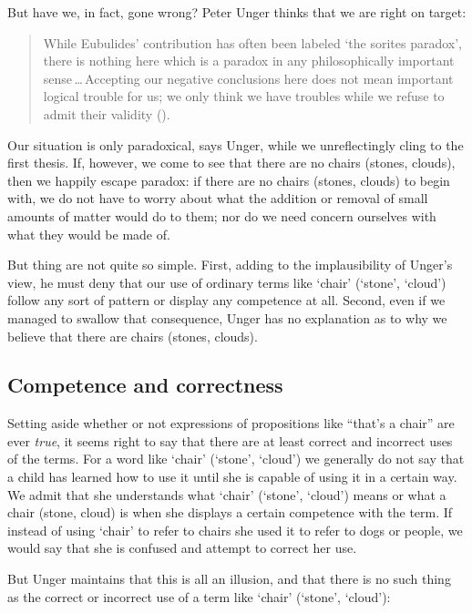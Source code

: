 \documentclass[11pt]{standalone} \newif\ifstandlone \standalonetrue
\newenvironment{squote}{%
	\begin{quote}\begin{singlespace}%
	}{%
	\end{singlespace}\end{quote}}
\begin{document}
\begin{spacing}{1.5}
But have we, in fact, gone wrong?  Peter Unger thinks that we are
right on target:

\begin{squote}
While Eubulides' contribution has often been labeled `the sorites
paradox', there is nothing here which is a paradox in any
philosophically important sense\,\ldots\,Accepting our negative
conclusions here does not mean important logical trouble for us; we
only think we have troubles while we refuse to admit their validity
(\citeyear[145]{unger1979}).
\end{squote}

Our situation is only paradoxical, says Unger, while we unreflectingly
cling to the first thesis.  If, however, we come to see that there are
no chairs (stones, clouds), then we happily escape paradox: if there
are no chairs (stones, clouds) to begin with, we do not have to worry
about what the addition or removal of small amounts of matter would do
to them; nor do we need concern ourselves with what they would be made
of.

But thing are not quite so simple.  First, adding to the
implausibility of Unger's view, he must deny that our use of ordinary
terms like `chair' (`stone', `cloud') follow any sort of pattern or
display any competence at all.  Second, even if we managed to swallow
that consequence, Unger has no explanation as to why we believe that
there are chairs (stones, clouds).

\subsection{Competence and correctness}
Setting aside whether or not expressions of propositions like ``that's
a chair'' are ever \emph{true}, it seems right to say that there are at
least correct and incorrect uses of the terms.  For a word like
`chair' (`stone', `cloud') we generally do not say that a child has
learned how to use it until she is capable of using it in a certain
way.  We admit that she understands what `chair' (`stone', `cloud')
means or what a chair (stone, cloud) is when she displays a certain
competence with the term.  If instead of using `chair' to refer to
chairs she used it to refer to dogs or people, we would say that she
is confused and attempt to correct her use.

But Unger maintains that this is all an illusion, and that there is no
such thing as the correct or incorrect use of a term like `chair'
(`stone', `cloud'):


\end{spacing}
\end{document}
